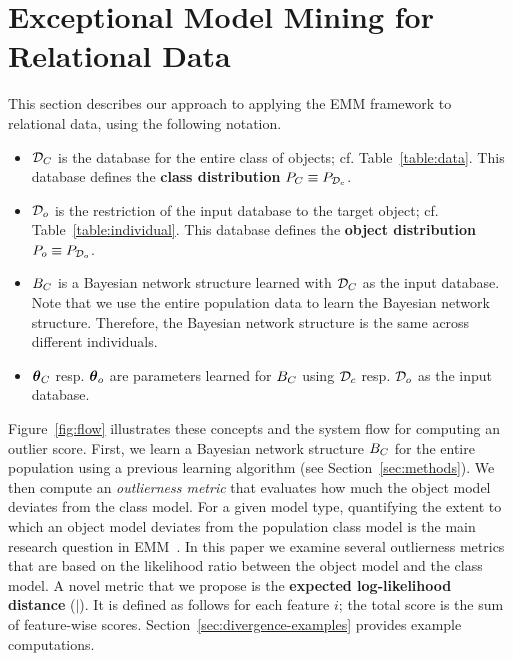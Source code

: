 {\section{Exceptional Model Mining for Relational Data} \label{sec:eld}

This section describes our approach to applying the EMM framework to relational data, using the following notation.
%
\begin{itemize}
	\item $\mathcal{D}_{C}$ is the database for the entire class of objects; cf. Table~\ref{table:data}. This database defines the \textbf{class distribution} $P_{C} \equiv P_{\mathcal{D}_{c}}$.
	\item $\mathcal{D}_{o}$ is the restriction of the input database to the target object; cf. Table~\ref{table:individual}. This database defines the \textbf{object distribution} $P_{o} \equiv P_{\mathcal{D}_{o}}$.
	\item $B_{C}$ is a Bayesian network structure learned with $\mathcal{D}_{C}$ as the input database. Note that we use the entire population data to learn the Bayesian network structure. Therefore, the Bayesian network structure is the same across different individuals.
	\item $\boldsymbol{\theta}_{C}$ resp. $\boldsymbol{\theta}_{o}$ are parameters learned for $B_{C}$ using $\mathcal{D}_{c}$ resp. $\mathcal{D}_{o}$ as the input database.
\end{itemize}

Figure~\ref{fig:flow} illustrates these concepts and the system flow for computing an outlier score. First, we learn a Bayesian network structure $B_{C}$ for the entire population using a previous learning algorithm (see Section~\ref{sec:methods}). We then compute an {\em outlierness metric} that evaluates how much the object model deviates from the class model. 
%
%
For a given model type, quantifying the extent to which an object model deviates from the population class model is the main research question in EMM~\citep{Duivesteijn2016}. In this paper we examine several outlierness metrics that are based on the likelihood ratio between the object model and the class model. 
A novel metric that we propose is the \textbf{expected log-likelihood distance} ($\mid$). It is defined as follows for each feature $i$; the total score is the sum of feature-wise scores. Section~\ref{sec:divergence-examples}  provides example computations.


}
